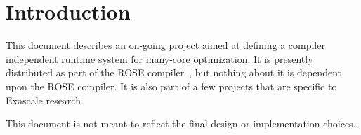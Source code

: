 \section{Introduction}
This document describes an on-going project aimed at defining a compiler independent
runtime system for many-core optimization.  It is presently distributed as 
part of the ROSE compiler~\cite{roseWeb2008}, but nothing about it is dependent 
upon the ROSE compiler. It is also part of a few projects that are specific to 
Exascale research.

This document is not meant to reflect the final design or implementation choices. 


